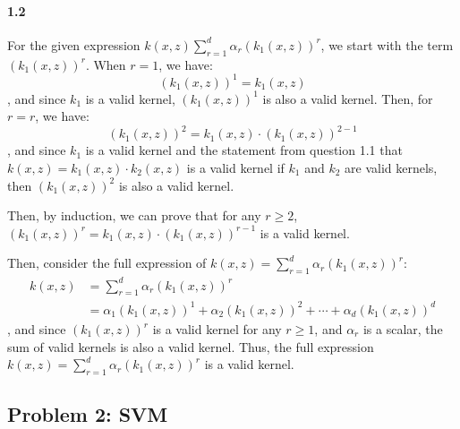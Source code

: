 \documentclass[11pt]{article}
\begin{document}
\paragraph{1.2}
For the given expression $k(x,z)\sum_{r=1}^d \alpha_r(k_1(x,z))^r$, we start with the term $(k_1(x,z))^r$.
When $r=1$, we have:
\begin{equation}
    (k_1(x, z))^1 = k_1(x,z)
\end{equation}
, and since $k_1$ is a valid kernel, $(k_1(x,z))^1$ is also a valid kernel.
Then, for $r=r$, we have:
\begin{equation}
    (k_1(x,z))^2 = k_1(x,z) \cdot (k_1(x, z))^{2-1}
\end{equation}
, and since $k_1$ is a valid kernel and the statement from question 1.1 that $k(x,z) = k_1(x, z)\cdot k_2(x, z)$ is a valid kernel if $k_1$ and $k_2$ are valid kernels, then $ (k_1(x,z))^2$ is also a valid kernel.

Then, by induction, we can prove that for any $r \geq 2$, $(k_1(x,z))^r = k_1(x,z) \cdot (k_1(x, z))^{r-1}$ is a valid kernel.

Then, consider the full expression of $k(x,z) = \sum_{r=1}^d \alpha_r(k_1(x,z))^r$:
\begin{equation}
    \begin{split}
        k(x,z) &= \sum_{r=1}^d \alpha_r(k_1(x,z))^r \\
        &= \alpha_1(k_1(x,z))^1 + \alpha_2(k_1(x,z))^2 + \cdots + \alpha_d(k_1(x,z))^d
    \end{split}
\end{equation}
, and since $(k_1(x,z))^r$ is a valid kernel for any $r \geq 1$, and $\alpha_r$ is a scalar, the sum of valid kernels is also a valid kernel.
Thus, the full expression $k(x,z) = \sum_{r=1}^d \alpha_r(k_1(x,z))^r$ is a valid kernel.

\subsection*{\Large Problem 2: SVM}
\end{document}
